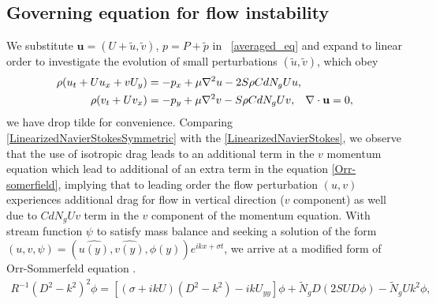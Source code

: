 \documentclass[12pt]{report}   %
\newcommand{\bu}{\mathbf{u}}
\newcommand{\Rey}{{R}}
\newcommand{\Ndg}{\tilde{N}_g}
\begin{document}
\subsection{Governing equation for flow instability}
We substitute $\bu = (U+\tilde{u}, \tilde{v})$, $p=P+\tilde{p}$ in ~\eqref{averaged_eq} and expand to linear order to investigate the evolution of small perturbations $(\tilde{u}, \tilde{v})$, which obey 
\begin{equation}
\begin{split}
\rho(u_t+U u_x+vU_y) &= -p_x+ {\mu}\nabla^2u-2S\rho C dN_{g}Uu, \\
\rho(v_t+ Uv_x) &= -p_y+ {\mu}\nabla^2v - S\rho C d N_g Uv, \hspace{0.3cm} \nabla\cdot\bu=0,
\label{LinearizedNavierStokesSymmetric}
\end{split} 
\end{equation}
we have drop tilde for convenience. Comparing \eqref{LinearizedNavierStokesSymmetric} with the \eqref{LinearizedNavierStokes}, we observe that the use of isotropic drag leads to an additional term in the $v$ momentum equation which lead to additional of an extra term in the equation  \ref{Orr-somerfield}, implying that to leading order the flow perturbation $(u,v)$ experiences additional drag for flow in vertical direction ($v$ component) as well due to $C d N_g Uv$ term in the $v$ component of the momentum equation. With stream function $\psi$ to satisfy mass balance and seeking a solution of the form $(u,v,\psi) = (\hat{u(y)},\hat{v(y)},\phi(y)) e^{ikx+\sigma t}$, we arrive at a modified form of Orr-Sommerfeld equation \cite{Drazin81,Chen97,Chu91}.
\begin{equation}
\begin{split}
\Rey^{-1}\left(D^2 -k^{2} \right)^2\phi = \left[ \left({\sigma}+ikU\right) \left(D^2-k^2\right) -ikU_{yy}\right]\phi + 
\Ndg D\left(2 S U D \phi\right) - \Ndg U k^2\phi,
\label{SymmetricOrr-somerfield}
\end{split}
\end{equation}
\end{document}
